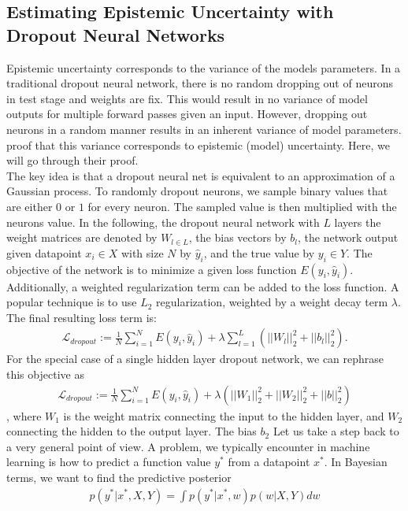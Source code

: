 \documentclass[a4paper,cleardoubleempty,BCOR1cm, 11pt]{report}
\begin{document}
\subsection{Estimating Epistemic Uncertainty with Dropout Neural Networks}
Epistemic uncertainty corresponds to the variance of the models parameters.
In a traditional dropout neural network, there is no random dropping out of neurons in test stage and weights are fix. This would result in no variance of model outputs for multiple forward passes given an input. However, dropping out neurons in a random manner results in an inherent variance of model parameters. \citet{gal2016dropout} proof that this variance corresponds to epistemic (model) uncertainty. Here, we will go through their proof.\\
The key idea is that a dropout neural net is equivalent to an approximation of a Gaussian process. To randomly dropout neurons, we sample binary values that are either $0$ or $1$ for every neuron. The sampled value is then multiplied with the neurons value.
In the following, the dropout neural network with $L$ layers the weight matrices are denoted by $W_{l \in L}$, the bias vectors by $b_l$, the network output given datapoint $x_i \in X$ with size $N$ by $\hat{y}_i$, and the true value by $y_i \in Y$. The objective of the network is to minimize a given loss function $E(y_i, \hat{y}_i)$. Additionally, a weighted regularization term can be added to the loss function. A popular technique is to use $L_2$ regularization, weighted by a weight decay term $\lambda$. The final resulting loss term is:
\begin{align*}
\mathcal{L}_{dropout} := \frac{1}{N}\sum_{i=1}^{N}E(y_i, \hat{y}_i) + \lambda \sum_{l=1}^{L}(||W_l||^2_2 + ||b_l||^2_2).
\end{align*}
For the special case of a single hidden layer dropout network, we can rephrase this objective as
\begin{align}\label{eq:dropout}
\mathcal{L}_{dropout} := \frac{1}{N}\sum_{i=1}^{N}E(y_i, \hat{y}_i) + \lambda (||W_1||^2_2 + ||W_2||^2_2+ ||b||^2_2)
\end{align}, where $W_1$ is the weight matrix connecting the input to the hidden layer, and $W_2$ connecting the hidden to the output layer. The bias $b_2$ 
Let us take a step back to a very general point of view. A problem, we typically encounter in machine learning is how to predict a function value $y^*$ from a datapoint $x^*$. In Bayesian terms, we want to find the predictive posterior
\begin{align}\label{eq:pred_post}
 p(y^*|x^*, X,Y) = \int p(y^*|x^*, w)p(w|X,Y)dw
\end{align}
\end{document}
